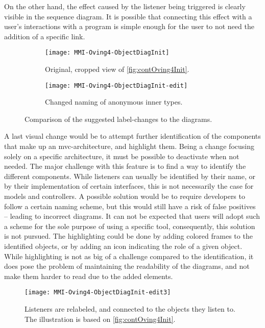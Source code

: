 On the other hand, the effect caused by the listener being triggered is clearly visible in the sequence diagram.
It is possible that connecting this effect with a user's interactions with a program is simple enough for the user to not need the addition of a specific link.

\begin{figure}[H]
	\centering
	\begin{subfigure}{\textwidth}
		\centering
		\texttt{[image: MMI-Oving4-ObjectDiagInit]}
		\caption{Original, cropped view of \cref{fig:contOving4Init}.}
		\label{fig:contOving4ChangesLabA}
	\end{subfigure}
	\begin{subfigure}{\textwidth}
		\centering
		\texttt{[image: MMI-Oving4-ObjectDiagInit-edit]}
		\caption{Changed naming of anonymous inner types.}
		\label{fig:contOving4ChangesLabB}
	\end{subfigure}
	\caption{Comparison of the suggested label-changes to the diagrams.}
	\label{fig:contOving4ChangesLab}
\end{figure}

A last visual change would be to attempt further identification of the components that make up an \gls{mvc}-architecture, and highlight them.
Being a change focusing solely on a specific architecture, it must be possible to deactivate when not needed.
The major challenge with this feature is to find a way to identify the different components.
While listeners can usually be identified by their name, or by their implementation of certain interfaces, this is not necessarily the case for models and controllers.
A possible solution would be to require developers to follow a certain naming scheme, but this would still have a risk of false positives -- leading to incorrect diagrams.
It can not be expected that users will adopt such a scheme for the sole purpose of using a specific tool, consequently, this solution is not pursued.
The highlighting could be done by adding colored frames to the identified objects, or by adding an icon indicating the role of a given object.
While highlighting is not as big of a challenge compared to the identification, it does pose the problem of maintaining the readability of the diagrams, and not make them harder to read due to the added elements.

\begin{figure}[H]
	\centering
	\texttt{[image: MMI-Oving4-ObjectDiagInit-edit3]}
	\caption{Listeners are relabeled, and connected to the objects they listen to. The illustration is based on \cref{fig:contOving4Init}.}
	\label{fig:contOving4ChangesLink}
\end{figure}

